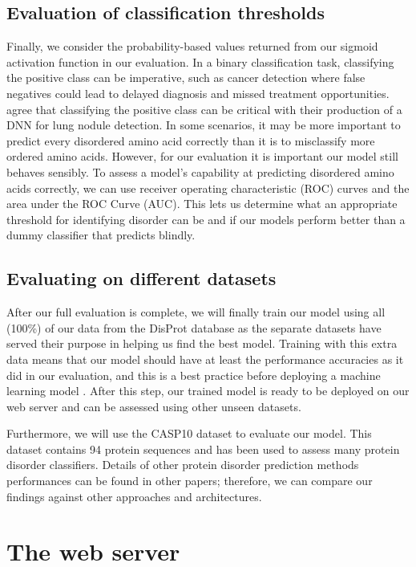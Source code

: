 \documentclass{l4proj}
\begin{document}
\subsection{Evaluation of classification thresholds}
\label{chap:design sec:evalThresh}

Finally, we consider the probability-based values returned from our sigmoid activation function in our evaluation. In a binary classification task, classifying the positive class can be imperative, such as cancer detection where false negatives could lead to delayed diagnosis and missed treatment opportunities. \cite{Ardila:19} agree that classifying the positive class can be critical with their production of a DNN for lung nodule detection. In some scenarios, it may be more important to predict every disordered amino acid correctly than it is to misclassify more ordered amino acids. However, for our evaluation it is important our model still behaves sensibly. To assess a model's capability at predicting disordered amino acids correctly, we can use receiver operating characteristic (ROC) curves and the area under the ROC Curve (AUC). This lets us determine what an appropriate threshold for identifying disorder can be and if our models perform better than a dummy classifier that predicts blindly.

\subsection{Evaluating on different datasets}
After our full evaluation is complete, we will finally train our model using all (100\%) of our data from the DisProt database as the separate datasets have served their purpose in helping us find the best model. Training with this extra data means that our model should have at least the performance accuracies as it did in our evaluation, and this is a best practice before deploying a machine learning model \citep{Brownlee:17}. After this step, our trained model is ready to be deployed on our web server and can be assessed using other unseen datasets. 

Furthermore, we will use the CASP10 dataset to evaluate our model. This dataset contains 94 protein sequences \citep{Moult:14} and has been used to assess many protein disorder classifiers. Details of other protein disorder prediction methods performances can be found in other papers; therefore, we can compare our findings against other approaches and architectures. 

\section{The web server}
\end{document}
